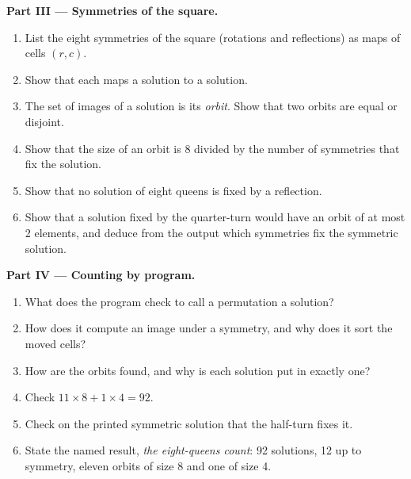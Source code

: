 \begin{problem}
\medskip\noindent\textbf{Part III --- Symmetries of the square.}
\begin{enumerate}[resume]
\item List the eight symmetries of the square (rotations and reflections) as maps of cells $(r, c)$.
\item Show that each maps a solution to a solution.
\item The set of images of a solution is its \emph{orbit}. Show that two orbits are equal or disjoint.
\item Show that the size of an orbit is 8 divided by the number of symmetries that fix the solution.
\item Show that no solution of eight queens is fixed by a reflection.
\item Show that a solution fixed by the quarter-turn would have an orbit of at most 2 elements, and deduce from the output
which symmetries fix the symmetric solution.
\end{enumerate}

\medskip\noindent\textbf{Part IV --- Counting by program.}
\begin{enumerate}[resume]
\item What does the program check to call a permutation a solution?
\item How does it compute an image under a symmetry, and why does it sort the moved cells?
\item How are the orbits found, and why is each solution put in exactly one?
\item Check $11 \times 8 + 1 \times 4 = 92$.
\item Check on the printed symmetric solution that the half-turn fixes it.
\item State the named result, \emph{the eight-queens count}: 92 solutions, 12 up to symmetry, eleven orbits of size 8 and
one of size 4.
\end{enumerate}
\end{problem}
